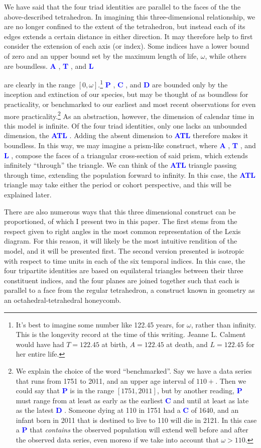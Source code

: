 \documentclass[11pt,oneside]{article} %
\newcommand\eg[1]{%
 \textcolor{blue}{\textbf{#1}\hspace{-.3em}}
}
\begin{document}
We have said that the four triad identities are parallel to the faces of the the
above-described tetrahedron. In imagining this three-dimensional
relationship, we are no longer confined to the extent of the tetrahedron, but
instead each of its edges extends a certain distance in either direction.
It may therefore help to first consider the extension of each axis (or index).
Some indices have a lower bound of zero and an upper bound set by the maximum
length of life, $\omega$, while others are boundless. \eg{A}, \eg{T}, and \eg{L}
are clearly in the range $[0,\omega]$.\footnote{It's best to imagine some number like 122.45 years, for $\omega$, rather than infinity. This is the longevity record at the time of this writing. Jeanne L. Calment would have had
$T=122.45$ at birth, $A = 122.45$ at death, and $L=122.45$ for her entire life.}
\eg{P}, \eg{C}, and \eg{D} are bounded only by the inception and extinction of
our species, but may be thought of as boundless for practicality, or benchmarked
to our earliest and most recent observations for even more
practicality.\footnote{We explain the choice of the word ``benchmarked''. Say
we have a data series that runs from 1751 to 2011, and an upper age
interval of $110+$. Then we could say that \eg{P} is in the range $[1751,2011]$,
but by another reading, \eg{P} must range from at least as early as the earliest
\eg{C} and until at least as late as the latest \eg{D}. Someone dying at 110 in 1751
had a \eg{C} of 1640, and an infant born in 2011 that is destined to live to 110
will die in 2121. In this case a \eg{P} that \textit{contains} the observed
population will extend well before and after the observed data series, even
moreso if we take into account that $\omega > 110$.} As an abstraction,
however, the dimension of calendar time in this model is infinite. Of the four
triad identities, only one lacks an unbounded dimension, the \eg{ATL}. Adding
the absent dimension to \eg{ATL} therefore makes it boundless. In this way, we
may imagine a prism-like construct, where \eg{A}, \eg{T}, and \eg{L}, compose
the faces of a triangular cross-section of said prism, which extends infinitely ``through'' the triangle.
We can think of the \eg{ATL} triangle passing through time, extending the population
forward to infinity. In this case, the \eg{ATL} triangle may take either the period
or cohort perspective, and this will be explained later. 

There are also
numerous ways that this three dimensional construct can be proportioned, of
which I present two in this paper. The first stems from the respect given to right angles in the most
common representation of the Lexis diagram. For this reason, it will likely be
the most intuitive rendition of the model, and it will be presented first. The
second version presented is isotropic with respect to time units in each of the
six temporal indices. In this case, the four tripartite identities are based on
equilateral triangles between their three constituent indices, and the four
planes are joined together such that each is parallel to a face from the regular
tetrahedron, a construct known in geometry as an octahedral-tetrahedral
honeycomb.
\end{document}
